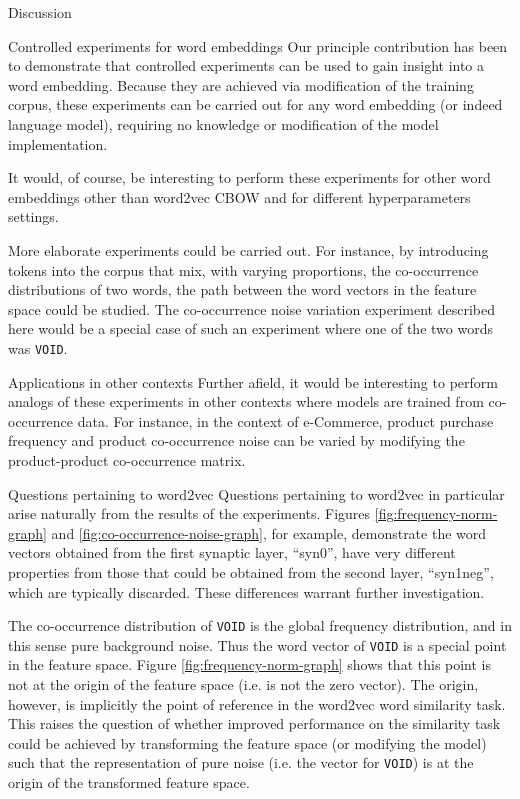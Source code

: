 \documentclass{article} %
\newcommand{\word}[1]{\texttt{#1}}
\begin{document}
\begin{section}{Discussion}\label{future-directions}

\begin{subsection}{Controlled experiments for word embeddings}
Our principle contribution has been to demonstrate that controlled experiments can be used to gain insight into a word embedding.
Because they are achieved via modification of the training corpus, these experiments can be carried out for any word embedding (or indeed language model), requiring no knowledge or modification of the model implementation.

It would, of course, be interesting to perform these experiments for other word embeddings other than word2vec CBOW and for different hyperparameters settings.

More elaborate experiments could be carried out.
For instance, by introducing tokens into the corpus that mix, with varying proportions, the co-occurrence distributions of two words, the path between the word vectors in the feature space could be studied.
The co-occurrence noise variation experiment described here would be a special case of such an experiment where one of the two words was \word{VOID}.
\end{subsection}

\begin{subsection}{Applications in other contexts}
Further afield, it would be interesting to perform analogs of these experiments in other contexts where models are trained from co-occurrence data.
For instance, in the context of e-Commerce, product purchase frequency and product co-occurrence noise can be varied by modifying the product-product co-occurrence matrix.
\end{subsection}

\begin{subsection}{Questions pertaining to word2vec}
Questions pertaining to word2vec in particular arise naturally from the results of the experiments.
Figures \ref{fig:frequency-norm-graph} and \ref{fig:co-occurrence-noise-graph}, for example, demonstrate the word vectors obtained from the first synaptic layer, ``syn0'', have very different properties from those that could be obtained from the second layer, ``syn1neg'', which are typically discarded.
These differences warrant further investigation.

The co-occurrence distribution of \word{VOID} is the global frequency distribution, and in this sense pure background noise.
Thus the word vector of \word{VOID} is a special point in the feature space.
Figure \ref{fig:frequency-norm-graph} shows that this point is not at the origin of the feature space (i.e. is not the zero vector).
The origin, however, is implicitly the point of reference in the word2vec word similarity task.
This raises the question of whether improved performance on the similarity task could be achieved by transforming the feature space (or modifying the model) such that the representation of pure noise (i.e. the vector for \word{VOID}) is at the origin of the transformed feature space. 


\end{subsection}
\end{section}
\end{document}
